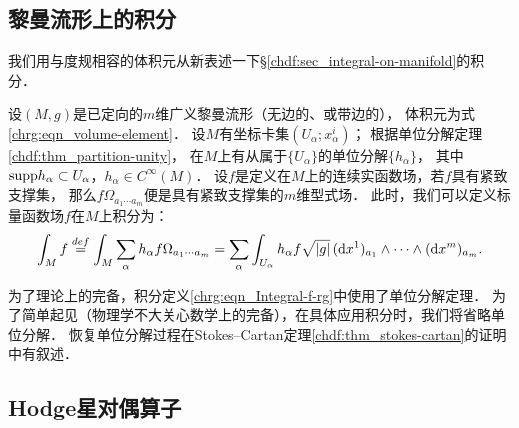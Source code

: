 \subsection{黎曼流形上的积分}\label{chrg:sec_integral}

我们用与度规相容的体积元从新表述一下\S\ref{chdf:sec_integral-on-manifold}的积分．

设$(M,g)$是已定向的$m$维广义黎曼流形（无边的、或带边的），
体积元为式\eqref{chrg:eqn_volume-element}．
设$M$有坐标卡集$(U_\alpha;x^i_\alpha)$；
根据单位分解定理\ref{chdf:thm_partition-unity}，
在$M$上有从属于$\{U_\alpha\}$的单位分解$\{h_\alpha\}$，
其中${\rm supp}h_\alpha \subset U_\alpha$，$h_\alpha \in C^\infty(M)$．
设$f$是定义在$M$上的连续实函数场，若$f$具有紧致支撑集，
那么$f \Omega_{a_1 \cdots a_m}$便是具有紧致支撑集的$m$维型式场．
此时，我们可以定义标量函数场$f$在$M$上积分为：
\begin{equation}\label{chrg:eqn_Integral-f-rg}
	\int_M f \overset{def}{=} \int_{M} \sum_{\alpha}  
	h_\alpha  f  \Omega_{a_1 \cdots a_m} 
	= \sum_{\alpha}  \int_{U_\alpha} h_\alpha f \sqrt{|g|}\, 
	({\rm d}x^1)_{a_1} \wedge \cdots \wedge({\rm d}x^m)_{a_m} .
\end{equation}

为了理论上的完备，积分定义\eqref{chrg:eqn_Integral-f-rg}中使用了单位分解定理．
为了简单起见（物理学不大关心数学上的完备），在具体应用积分时，我们将省略单位分解．
恢复单位分解过程在Stokes--Cartan定理\ref{chdf:thm_stokes-cartan}的证明中有叙述．


\subsection{Hodge星对偶算子}\label{chrg:sec_Hodge}

